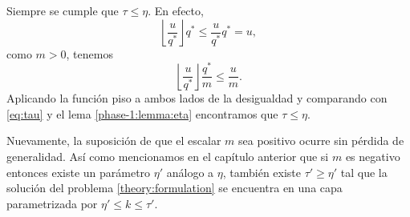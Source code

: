 \begin{observation}
	Siempre se cumple que $\tau \leq \eta$. En efecto,
	\begin{equation*}
		\left\lfloor \frac{u}{q^*} \right\rfloor q^*
		\leq \frac{u}{q^*} q^* = u,
	\end{equation*}
	como $m > 0$, tenemos
	\begin{equation*}
		\left\lfloor \frac{u}{q^*} \right\rfloor \frac{q^*}{m}
		\leq \frac{u}{m}.
	\end{equation*}
	Aplicando la función piso a ambos lados de la desigualdad y comparando con \eqref{eq:tau} y el
	lema \ref{phase-1:lemma:eta} encontramos que $\tau \leq \eta$.
\end{observation}
\begin{observation}
	Nuevamente, la suposición de que el escalar $m$ sea positivo ocurre sin pérdida de generalidad.
	Así como mencionamos en el capítulo anterior que si $m$ es negativo entonces existe un parámetro
	$\eta'$ análogo a $\eta$, también existe $\tau' \geq \eta'$ tal que la solución del problema
	\eqref{theory:formulation} se encuentra en una capa parametrizada por $\eta' \leq k \leq \tau'$.
\end{observation}


